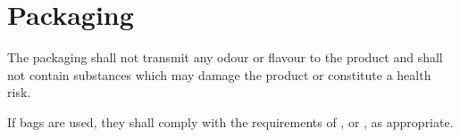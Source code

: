 \section{Packaging}

The packaging shall not transmit any odour or flavour to the product and shall not contain substances which may damage the product or constitute a health risk.

If bags are used, they shall comply with the requirements of
, or \cite{ISO8351-2}, as appropriate.
